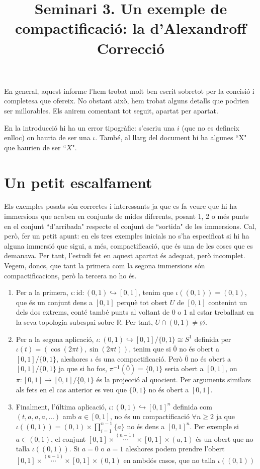 \documentclass{article}
\title{\bfseries\Large Seminari 3. Un exemple de compactificació: la d'Alexandroff\\ Correcció}
\author{}
\date{\parbox{\linewidth}{\centering
  Topologia\endgraf
  Grau en Matemàtiques\endgraf
  Universitat Autònoma de Barcelona\endgraf
  Gener de 2022}}
\begin{document}
\maketitle
En general, aquest informe l'hem trobat molt ben escrit sobretot per la concisió i completesa que ofereix. No obstant això, hem trobat alguns detalls que podrien ser millorables. Els anirem comentant tot seguit, apartat per apartat.

En la introducció hi ha un error tipogràfic: s'escriu una $i$ (que no es defineix enlloc) on hauria de ser una $\iota$. També, al llarg del document hi ha algunes ``X" que haurien de ser ``$X$".

\section{Un petit escalfament}

Els exemples posats són correctes i interessants ja que es fa veure que hi ha immersions que acaben en conjunts de mides diferents, posant 1, 2 o més punts en el conjunt ``d'arribada" respecte el conjunt de ``sortida" de les immersions. Cal, però, fer un petit apunt: en els tres exemples inicials no s'ha especificat si hi ha alguna immersió que sigui, a més, compactificació, que és una de les coses que es demanava. Per tant, l'estudi fet en aquest apartat és adequat, però incomplet. Vegem, doncs, que tant la primera com la segona immersions són compactificacions, però la tercera no ho és.
\begin{enumerate}
  \item Per a la primera, $\iota:\text{id}:(0,1)\hookrightarrow[0,1]$, tenim que $\iota((0,1))=(0,1)$, que és un conjunt dens a $[0,1]$ perquè tot obert $U$ de $[0,1]$ contenint un dels dos extrems, conté també punts al voltant de 0 o 1 al estar treballant en la seva topologia subespai sobre $\mathbb{R}$. Per tant, $U\cap (0,1)\ne\varnothing$.
  \item Per a la segona aplicació, $\iota:(0,1)\hookrightarrow [0,1]/\{0,1\}\cong S^1$ definida per $\iota(t)=(\cos(2\pi t),\sin(2\pi t))$, tenim que si $\overline{0}$ no és obert a $[0,1]/\{0,1\}$, aleshores $\iota$ és una compactificació. Però $\overline{0}$ no és obert a $[0,1]/\{0,1\}$ ja que si ho fos, $\pi^{-1}(\overline{0})=\{0,1\}$ seria obert a $[0,1]$, on $\pi:[0,1]\rightarrow[0,1]/\{0,1\}$ és la projecció al quocient. Per arguments similars als fets en el cas anterior es veu que $\{0,1\}$ no és obert a $[0,1]$.
  \item Finalment, l'última aplicació, $\iota:(0,1)\hookrightarrow{[0,1]^n}$ definida com $(t,a,a,a,\ldots)$ amb $a\in[0,1]$, no és un compactificació $\forall n\geq 2$ ja que $\iota((0,1))=(0,1)\times\prod_{i=1}^{n-1}\{a\}$ no és dens a ${[0,1]}^n$. Per exemple si $a\in(0,1)$, el conjunt $[0,1]\times\overset{(n-1)}{\cdots}\times[0,1]\times(a,1)$ és un obert que no talla $\iota((0,1))$. Si $a=0$ o $a=1$ aleshores podem prendre l'obert $[0,1]\times\overset{(n-1)}{\cdots}\times[0,1]\times(0,1)$ en ambdós casos, que no talla $\iota((0,1))$
\end{enumerate}
\end{document}
